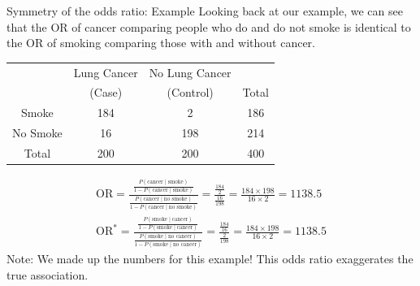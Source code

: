 \documentclass[10pt,t]{beamer}
\begin{document}
\begin{frame}{Symmetry of the odds ratio: Example}
	\vspace{-0.8cm}
	Looking back at our example, we can see that the OR of cancer comparing people who do and do not smoke is identical to the OR of smoking comparing those with and without cancer. 
	\begin{center}
		\begin{table}
			\begin{tabular}{|c|cc|c|}
				\hline 
				& Lung Cancer & No Lung Cancer &  \\ 
				& (Case) & (Control) & Total  \\
				\hline 
				Smoke & 184 & 2  & 186 \\ 
				No Smoke & 16 & 198 & 214  \\ 
				\hline 
				Total & 200 & 200 & 400 \\ 
				\hline 
			\end{tabular}
		\end{table} 
	\end{center}
	\begin{align*}
		\text{OR} = \frac{\frac{P(\text{cancer} \mid \text{smoke})}{1 - P(\text{cancer} \mid \text{smoke})}}{\frac{P(\text{cancer} \mid \text{no smoke})}{1 - P(\text{cancer} \mid \text{no smoke})}}  = \frac{\frac{184}{2}}{\frac{16}{198}} = \frac{184\times 198}{16 \times 2} = 1138.5\\  
		\text{OR}^* =\frac{\frac{P(\text{smoke} \mid \text{cancer})}{1 - P(\text{smoke} \mid \text{cancer})}}{\frac{P(\text{smoke} \mid \text{no cancer})}{1 - P(\text{smoke} \mid \text{no cancer})}}  = \frac{\frac{184}{16}}{\frac{2}{198}} = \frac{184\times 198}{16 \times 2} = 1138.5
	\end{align*}
\vfill 
\tiny Note: We made up the numbers for this example! This odds ratio exaggerates the true association.

\end{frame}
\end{document}
